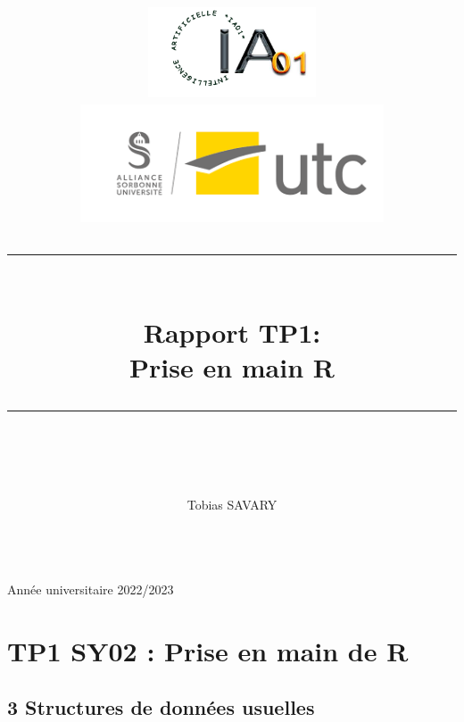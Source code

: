 \documentclass[
]{article}
\newcommand{\HRule}[1]{\rule{\linewidth}{#1}}
\begin{document}
\title{ 
  \begin{center}
          \includegraphics[width=5cm]{img/logo_IA01.png} \hspace*{1cm}
          \includegraphics[width=9cm]{img/logo_UTC.png} \\ [2cm]
  \end{center}
		\HRule{2pt} \\

		\LARGE \textbf{Rapport TP1:\\Prise en main R \\} 
		\HRule{2pt} \\ [5.5cm]


		\normalsize  
        \author{
            Tobias SAVARY \\[0.5cm]
           \\[1cm]
        }
		}
		\maketitle
        \begin{center}
            Année universitaire 2022/2023
        \end{center}
\pagebreak

\tableofcontents

\pagebreak

\hypertarget{tp1-sy02-prise-en-main-de-r}{%
\section{TP1 SY02 : Prise en main de
R}\label{tp1-sy02-prise-en-main-de-r}}

\hypertarget{structures-de-donnuxe9es-usuelles}{%
\subsection{3 Structures de données
usuelles}\label{structures-de-donnuxe9es-usuelles}}
\end{document}
